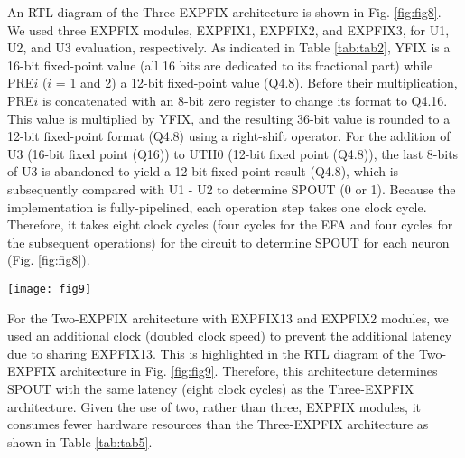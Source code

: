 \documentclass[10pt,journal]{IEEEtran}
\begin{document}
An RTL diagram of the Three-EXP\textunderscore FIX architecture is shown in Fig. \ref{fig:fig8}. 
We used three EXP\textunderscore FIX modules, EXP\textunderscore FIX1, EXP\textunderscore FIX2, and EXP\textunderscore FIX3, for U1, U2, and U3 evaluation, respectively. 
As indicated in Table \ref{tab:tab2}, Y\textunderscore FIX is a 16-bit fixed-point value (all 16 bits are dedicated to its fractional part) while PRE$i$ ($i$ = 1 and 2) a 12-bit fixed-point value (Q4.8).
Before their multiplication, PRE$i$ is concatenated with an 8-bit zero register to change its format to Q4.16. 
This value is multiplied by Y\textunderscore FIX, and the resulting 36-bit value is rounded to a 12-bit fixed-point format (Q4.8) using a right-shift operator.
For the addition of U3 (16-bit fixed point (Q16)) to UTH0 (12-bit fixed point (Q4.8)), the last 8-bits of U3 is abandoned to yield a 12-bit fixed-point result (Q4.8), which is subsequently compared with U1 - U2 to determine SP\textunderscore OUT (0 or 1).
Because the implementation is fully-pipelined, each operation step takes one clock cycle. 
Therefore, it takes eight clock cycles (four cycles for the EFA and four cycles for the subsequent operations) for the circuit to determine SP\textunderscore OUT for each neuron (Fig. \ref{fig:fig8}).

\begin{figure*}[bth]\centering
\texttt{[image: fig9]}
\caption{\label{fig:fig9} RTL diagram of the Two-EXP\textunderscore FIX architecture.}
\end{figure*}

For the Two-EXP\textunderscore FIX architecture with EXP\textunderscore FIX13 and EXP\textunderscore FIX2 modules, we used an additional clock (doubled clock speed) to prevent the additional latency due to sharing EXP\textunderscore FIX13. 
This is highlighted in the RTL diagram of the Two-EXP\textunderscore FIX architecture in Fig. \ref{fig:fig9}. 
Therefore, this architecture determines SP\textunderscore OUT with the same latency (eight clock cycles) as the Three-EXP\textunderscore FIX architecture. 
Given the use of two, rather than three, EXP\textunderscore FIX modules, it consumes fewer hardware resources than the Three-EXP\textunderscore FIX architecture as shown in Table \ref{tab:tab5}.
\end{document}

